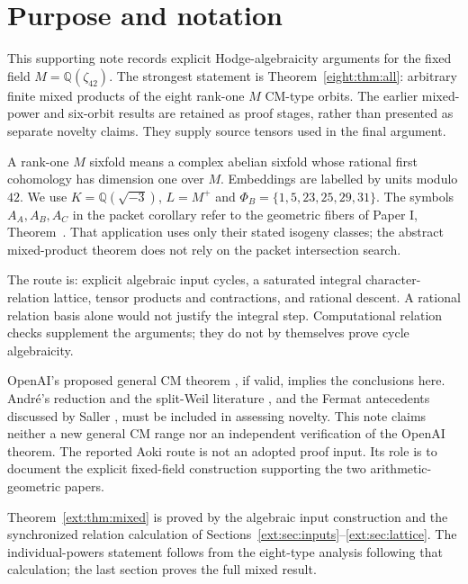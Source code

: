 \section{Purpose and notation}
This supporting note records explicit Hodge-algebraicity arguments for the
fixed field $M=\mathbb Q(\zeta_{42})$. The strongest statement is
Theorem~\ref{eight:thm:all}: arbitrary finite mixed products of the eight
rank-one $M$ CM-type orbits. The earlier mixed-power and six-orbit results
are retained as proof stages, rather than presented as separate novelty
claims. They supply source tensors used in the final argument.

A rank-one $M$ sixfold means a complex abelian sixfold whose rational first
cohomology has dimension one over $M$. Embeddings are labelled by units
modulo $42$. We use $K=\mathbb Q(\sqrt{-3})$, $L=M^+$ and
$\Phi_B=\{1,5,23,25,29,31\}$. The symbols $A_A,A_B,A_C$ in the packet
corollary refer to the geometric fibers of Paper I, Theorem~.
That application uses only their stated isogeny classes; the abstract
mixed-product theorem does not rely on the packet intersection search.

The route is: explicit algebraic input cycles, a saturated integral
character-relation lattice, tensor products and contractions, and rational
descent. A rational relation basis alone would not justify the integral
step. Computational relation checks supplement the arguments; they do
not by themselves prove cycle algebraicity.

OpenAI's proposed general CM theorem \cite{OpenAICM2026}, if valid,
implies the conclusions here. Andr\'e's reduction and the split-Weil
literature \cite{Andre1992,MilneHodge2020,Markman2025,Schoen1998}, and the
Fermat antecedents discussed by Saller \cite{Saller2026}, must be included
in assessing novelty. This note claims neither a new general CM range
nor an independent verification of the OpenAI theorem. The reported Aoki
route is not an adopted proof input. Its role is to document the explicit
fixed-field construction supporting the two arithmetic-geometric papers.

Theorem~\ref{ext:thm:mixed} is proved by the algebraic input construction
and the synchronized relation calculation of
Sections~\ref{ext:sec:inputs}--\ref{ext:sec:lattice}.
The individual-powers statement follows from the eight-type analysis
following that calculation; the last section proves the full mixed result.
